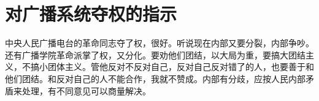 \section[对广播系统夺权的指示（一九六七年一月二十三日）]{对广播系统夺权的指示}


中央人民广播电台的革命同志夺了权，很好。听说现在内部又要分裂，内部争吵。还有广播学院革命派掌了权，又分化。要劝他们团结，以大局为重，要搞大团结主义，不搞小团体主义。管他反对不反对自己，反对自己反对错了的人，也要善于和他们团结。和反对自己的人不能合作，我就不赞成。内部有分歧，应按人民内部矛盾来处理，有不同意见可以商量解决。


